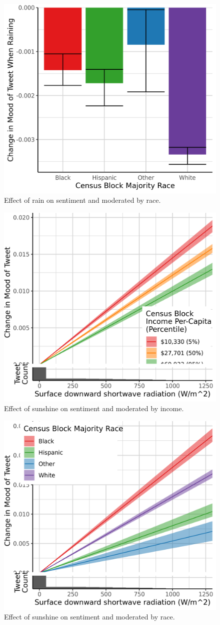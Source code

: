 \documentclass{article}
\begin{document}
\begin{figure}[H]
  \centering
  \includegraphics[width=0.6\linewidth]{../res/raining-race_q.png}
  \caption{Effect of rain on sentiment and moderated by race.}
  \label{fig:timeseries}
\end{figure}


\begin{figure}[H]
  \centering
  \includegraphics[width=0.6\linewidth]{../res/srad-income.png}
  \caption{Effect of sunshine on sentiment and moderated by income.}
  \label{fig:timeseries}
\end{figure}

\begin{figure}[H]
  \centering
  \includegraphics[width=0.6\linewidth]{../res/srad-race_q.png}
  \caption{Effect of sunshine on sentiment and moderated by race.}
  \label{fig:timeseries}
\end{figure}
\end{document}
